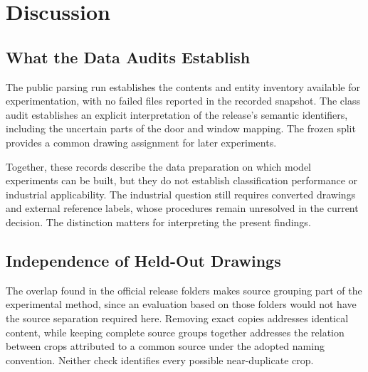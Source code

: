 \chapter{Discussion}
\label{ch:discussion}

\section{What the Data Audits Establish}
\label{sec:audit-interpretation}
The public parsing run establishes the contents and entity inventory available for
experimentation, with no failed files reported in the recorded snapshot.
The class audit establishes an explicit interpretation of the release's semantic
identifiers, including the uncertain parts of the door and window mapping.
The frozen split provides a common drawing assignment for later experiments.

Together, these records describe the data preparation on which model experiments
can be built, but they do not establish classification performance or industrial
applicability.
The industrial question still requires converted drawings and external reference
labels, whose procedures remain unresolved in the current decision.
The distinction matters for interpreting the present findings.

\section{Independence of Held-Out Drawings}
\label{sec:split-limitations}
The overlap found in the official release folders makes source grouping part of
the experimental method, since an evaluation based on those folders would not
have the source separation required here.
Removing exact copies addresses identical content, while keeping complete source
groups together addresses the relation between crops attributed to a common
source under the adopted naming convention.
Neither check identifies every possible near-duplicate crop.

